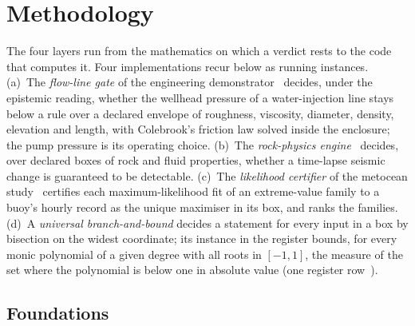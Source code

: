 \documentclass[preprint,11pt,a4paper]{elsarticle}
\theoremstyle{definition}
\begin{document}
\section{Methodology}\label{sec:method}

The four layers run from the mathematics on which a verdict rests to the code that computes it. Four implementations recur below as running instances. (a)~The \emph{flow-line gate} of the engineering demonstrator~\citep{P2} decides, under the epistemic reading, whether the wellhead pressure of a water-injection line stays below a rule over a declared envelope of roughness, viscosity, diameter, density, elevation and length, with Colebrook's friction law solved inside the enclosure; the pump pressure is its operating choice. (b)~The \emph{rock-physics engine}~\citep{P3} decides, over declared boxes of rock and fluid properties, whether a time-lapse seismic change is guaranteed to be detectable. (c)~The \emph{likelihood certifier} of the metocean study~\citep{P1} certifies each maximum-likelihood fit of an extreme-value family to a buoy's hourly record as the unique maximiser in its box, and ranks the families. (d)~A \emph{universal branch-and-bound} decides a statement for every input in a box by bisection on the widest coordinate; its instance in the register bounds, for every monic polynomial of a given degree with all roots in $[-1,1]$, the measure of the set where the polynomial is below one in absolute value (one register row~\citep{Register}).

\subsection{Foundations}\label{sec:foundations}
\end{document}
